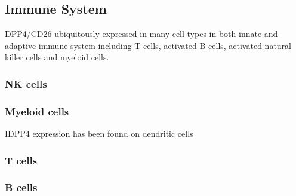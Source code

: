 \subsection{Immune System}
DPP4/CD26 ubiquitously expressed in many cell types in both innate and adaptive immune system including T cells, activated B cells, activated natural killer cells and myeloid cells.~\cite{Abbott1994,Shingu2003,Hong1989,Gutschmidt1981,Dikov2004,Bühling1995,Tanaka1992,Gorrell1991}  

\subsubsection{NK cells}

\subsubsection{Myeloid cells}
IDPP4 expression has been found on dendritic cells~\cite{Zhong2013,Gliddon2002,Epardaud2004}

\subsubsection{T cells}
\subsubsection{B cells}
